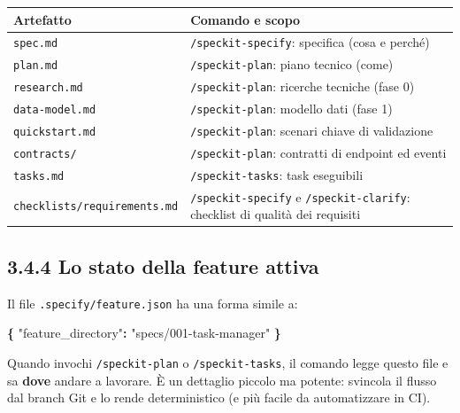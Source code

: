 \documentclass[
  italian,
  10pt,
]{book}
\newenvironment{Shaded}{\begin{snugshade}}{\end{snugshade}}
\newcommand{\DataTypeTok}[1]{\textcolor[rgb]{0.13,0.29,0.53}{#1}}
\newcommand{\FunctionTok}[1]{\textcolor[rgb]{0.13,0.29,0.53}{\textbf{#1}}}
\newcommand{\StringTok}[1]{\textcolor[rgb]{0.31,0.60,0.02}{#1}}
\newcounter{none} %
\begin{document}
{\def\LTcaptype{none} %
\begin{longtable}[]{@{}
  >{\raggedright\arraybackslash}p{}
  >{\raggedright\arraybackslash}p{}@{}}
\toprule\noalign{}
\begin{minipage}[b]{\linewidth}\raggedright
Artefatto
\end{minipage} & \begin{minipage}[b]{\linewidth}\raggedright
Comando e scopo
\end{minipage} \\
\midrule\noalign{}
\endhead
\bottomrule\noalign{}
\endlastfoot
\texttt{spec.md} & \texttt{/speckit-specify}: specifica (cosa e
perché) \\
\texttt{plan.md} & \texttt{/speckit-plan}: piano tecnico (come) \\
\texttt{research.md} & \texttt{/speckit-plan}: ricerche tecniche (fase
0) \\
\texttt{data-model.md} & \texttt{/speckit-plan}: modello dati (fase
1) \\
\texttt{quickstart.md} & \texttt{/speckit-plan}: scenari chiave di
validazione \\
\texttt{contracts/} & \texttt{/speckit-plan}: contratti di endpoint ed
eventi \\
\texttt{tasks.md} & \texttt{/speckit-tasks}: task eseguibili \\
\texttt{checklists/requirements.md} & \texttt{/speckit-specify} e
\texttt{/speckit-clarify}: checklist di qualità dei requisiti \\
\end{longtable}
}

\subsection{3.4.4 Lo stato della feature
attiva}\label{lo-stato-della-feature-attiva}

Il file \texttt{.specify/feature.json} ha una forma simile a:

\begin{Shaded}
\begin{Highlighting}[]
\FunctionTok{\{}
  \DataTypeTok{"feature\_directory"}\FunctionTok{:} \StringTok{"specs/001{-}task{-}manager"}
\FunctionTok{\}}
\end{Highlighting}
\end{Shaded}

Quando invochi \texttt{/speckit-plan} o \texttt{/speckit-tasks}, il
comando legge questo file e sa \textbf{dove} andare a lavorare. È un
dettaglio piccolo ma potente: svincola il flusso dal branch Git e lo
rende deterministico (e più facile da automatizzare in CI).
\end{document}
